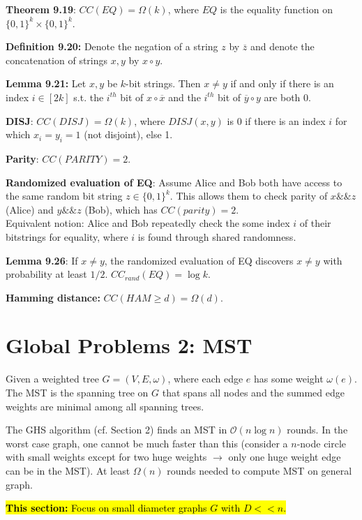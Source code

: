 \documentclass[a4paper, 8pt, landscape]{scrartcl}
\begin{document}
\begin{multicols*}{3}
\textbf{Theorem 9.19}: $CC(EQ) = \Omega(k)$, where $EQ$ is the equality function on $\{0,1\}^k \times \{0,1\}^k$.

\textbf{Definition 9.20:} Denote the negation of a string $z$ by $\overline{z}$ and denote the concatenation of strings $x,y$ by $x \circ y$.

\textbf{Lemma 9.21:} Let $x,y$ be $k$-bit strings. Then $x \neq y$ if and only if there is an index $i \in [2k]$ s.t. the $i^{th}$ bit of $x \circ \overline{x}$ and the $i^{th}$ bit of $\overline{y} \circ y$ are both 0.

\textbf{DISJ}: $CC(DISJ) = \Omega(k)$, where $DISJ(x,y)$ is 0 if there is an index $i$ for which $x_i = y_i = 1$ (not disjoint), else 1.

\textbf{Parity}: $CC(PARITY) = 2$.

\textbf{Randomized evaluation of EQ}: Assume Alice and Bob both have access to the same random bit string $z \in \{0,1\}^k$. This allows them to check parity of $x \&\& z$ (Alice) and $y \&\& z$ (Bob), which has $CC(parity) = 2$.\\
Equivalent notion: Alice and Bob repeatedly check the some index $i$ of their bitstrings for equality, where $i$ is found through shared randomness.

\textbf{Lemma 9.26}: If $x \neq y$, the randomized evaluation of EQ discovers $x \neq y$ with probability at least $1/2$. $CC_{rand}(EQ) = \log k$. 

\textbf{Hamming distance:} $CC(HAM \geq d) = \Omega(d)$.

\section{Global Problems 2: MST}

Given a weighted tree $G = (V, E, \omega)$, where each edge $e$ has some weight $\omega(e)$. The MST is the spanning tree on $G$ that spans all nodes and the summed edge weights are minimal among all spanning trees.

The GHS algorithm (cf. Section 2) finds an MST in $\mathcal{O}(n \log n)$ rounds. In the worst case graph, one cannot be much faster than this (consider a $n$-node circle with small weights except for two huge weights $\rightarrow$ only one huge weight edge can be in the MST). At least $\Omega(n)$ rounds needed to compute MST on general graph.

\hl{\textbf{This section:} Focus on small diameter graphs $G$ with $D << n$.}



\end{multicols*}
\end{document}
